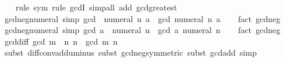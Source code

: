 \begin{isabellebody}
\ \ %
\endisadelimproof
%
\isatagproof
{}\isamarkupfalse%
\ {\isacharparenleft}{\kern0pt}rule\ sym{\isacharcomma}{\kern0pt}\ rule\ gcdI{\isacharparenright}{\kern0pt}\ {\isacharparenleft}{\kern0pt}simp{\isacharunderscore}{\kern0pt}all\ add{\isacharcolon}{\kern0pt}\ gcd{\isacharunderscore}{\kern0pt}greatest{\isacharparenright}{\kern0pt}%
\endisatagproof
{\isafoldproof}%
%
\isadelimproof
\isanewline
%
\endisadelimproof
\isanewline
{}\isamarkupfalse%
\ gcd{\isacharunderscore}{\kern0pt}neg{\isacharunderscore}{\kern0pt}numeral{\isacharunderscore}{\kern0pt}{}\ {\isacharbrackleft}{\kern0pt}simp{\isacharbrackright}{\kern0pt}{\isacharcolon}{\kern0pt}\ {\isachardoublequoteopen}gcd\ {\isacharparenleft}{\kern0pt}{\isacharminus}{\kern0pt}\ numeral\ n{\isacharparenright}{\kern0pt}\ a\ {\isacharequal}{\kern0pt}\ gcd\ {\isacharparenleft}{\kern0pt}numeral\ n{\isacharparenright}{\kern0pt}\ a{\isachardoublequoteclose}\isanewline
%
\isadelimproof
\ \ %
\endisadelimproof
%
\isatagproof
{}\isamarkupfalse%
\ {\isacharparenleft}{\kern0pt}fact\ gcd{\isacharunderscore}{\kern0pt}neg{}{\isacharparenright}{\kern0pt}%
\endisatagproof
{\isafoldproof}%
%
\isadelimproof
\isanewline
%
\endisadelimproof
\isanewline
{}\isamarkupfalse%
\ gcd{\isacharunderscore}{\kern0pt}neg{\isacharunderscore}{\kern0pt}numeral{\isacharunderscore}{\kern0pt}{}\ {\isacharbrackleft}{\kern0pt}simp{\isacharbrackright}{\kern0pt}{\isacharcolon}{\kern0pt}\ {\isachardoublequoteopen}gcd\ a\ {\isacharparenleft}{\kern0pt}{\isacharminus}{\kern0pt}\ numeral\ n{\isacharparenright}{\kern0pt}\ {\isacharequal}{\kern0pt}\ gcd\ a\ {\isacharparenleft}{\kern0pt}numeral\ n{\isacharparenright}{\kern0pt}{\isachardoublequoteclose}\isanewline
%
\isadelimproof
\ \ %
\endisadelimproof
%
\isatagproof
{}\isamarkupfalse%
\ {\isacharparenleft}{\kern0pt}fact\ gcd{\isacharunderscore}{\kern0pt}neg{}{\isacharparenright}{\kern0pt}%
\endisatagproof
{\isafoldproof}%
%
\isadelimproof
\isanewline
%
\endisadelimproof
\isanewline
{}\isamarkupfalse%
\ gcd{\isacharunderscore}{\kern0pt}diff{}{\isacharcolon}{\kern0pt}\ {\isachardoublequoteopen}gcd\ {\isacharparenleft}{\kern0pt}m\ {\isacharminus}{\kern0pt}\ n{\isacharparenright}{\kern0pt}\ n\ {\isacharequal}{\kern0pt}\ gcd\ m\ n{\isachardoublequoteclose}\isanewline
%
\isadelimproof
\ \ %
\endisadelimproof
%
\isatagproof
{}\isamarkupfalse%
\ {\isacharparenleft}{\kern0pt}subst\ diff{\isacharunderscore}{\kern0pt}conv{\isacharunderscore}{\kern0pt}add{\isacharunderscore}{\kern0pt}uminus{\isacharcomma}{\kern0pt}\ subst\ gcd{\isacharunderscore}{\kern0pt}neg{}{\isacharbrackleft}{\kern0pt}symmetric{\isacharbrackright}{\kern0pt}{\isacharcomma}{\kern0pt}\ subst\ gcd{\isacharunderscore}{\kern0pt}add{}{\isacharcomma}{\kern0pt}\ simp{\isacharparenright}{\kern0pt}%

\end{isabellebody}
